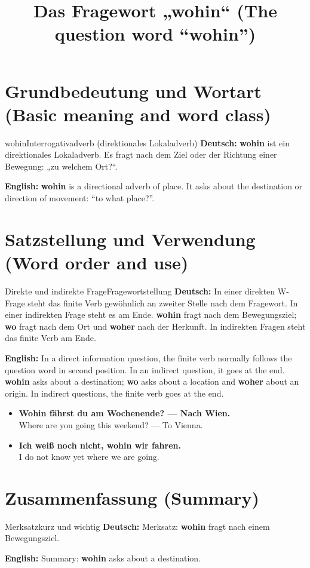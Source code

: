 \documentclass[a4paper,11pt]{article}
\title{Das Fragewort „wohin“ (The question word “wohin”)}
\date{}
\newcommand{\GermanText}[1]{\textbf{Deutsch: }#1\par}
\newcommand{\EnglishText}[1]{{\small\color{SoftGray}\textbf{English: }#1\par}}
\newcommand{\ExampleItem}[2]{\item \textbf{#1}\\{\small\color{SoftGray}#2}}
\begin{document}
\maketitle
\tableofcontents
\newpage
\section{Grundbedeutung und Wortart (Basic meaning and word class)}
\begin{grammarentry}{wohin}{Interrogativadverb (direktionales Lokaladverb)}
\GermanText{\textbf{wohin} ist ein direktionales Lokaladverb. Es fragt nach dem Ziel oder der Richtung einer Bewegung: „zu welchem Ort?“.}
\EnglishText{\textbf{wohin} is a directional adverb of place. It asks about the destination or direction of movement: “to what place?”.}

\end{grammarentry}
\section{Satzstellung und Verwendung (Word order and use)}
\begin{grammarentry}{Direkte und indirekte Frage}{Fragewortstellung}
\GermanText{In einer direkten W-Frage steht das finite Verb gewöhnlich an zweiter Stelle nach dem Fragewort. In einer indirekten Frage steht es am Ende. \textbf{wohin} fragt nach dem Bewegungsziel; \textbf{wo} fragt nach dem Ort und \textbf{woher} nach der Herkunft. In indirekten Fragen steht das finite Verb am Ende.}
\EnglishText{In a direct information question, the finite verb normally follows the question word in second position. In an indirect question, it goes at the end. \textbf{wohin} asks about a destination; \textbf{wo} asks about a location and \textbf{woher} about an origin. In indirect questions, the finite verb goes at the end.}
\end{grammarentry}
\begin{exbox}\begin{itemize}
\ExampleItem{Wohin fährst du am Wochenende? — Nach Wien.}{Where are you going this weekend? — To Vienna.}
\ExampleItem{Ich weiß noch nicht, wohin wir fahren.}{I do not know yet where we are going.}
\end{itemize}\end{exbox}
\section{Zusammenfassung (Summary)}
\begin{grammarentry}{Merksatz}{kurz und wichtig}
\GermanText{Merksatz: \textbf{wohin} fragt nach einem Bewegungsziel.}
\EnglishText{Summary: \textbf{wohin} asks about a destination.}
\end{grammarentry}
\end{document}
